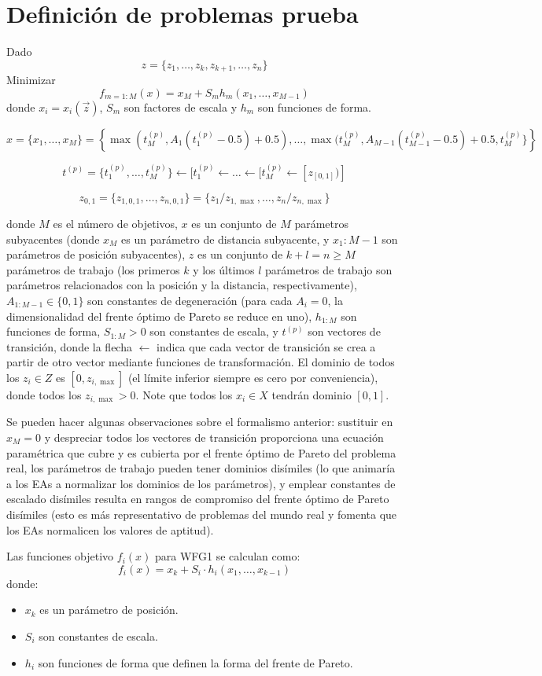 \chapter{Definición de problemas prueba}


Dado 
$$ z = \{z_1, \ldots, z_k, z_{k+1}, \ldots, z_n\} $$
Minimizar
$$ f_{m=1:M}(x) = x_M + S_m h_m(x_1, \ldots, x_{M-1}) $$
donde $x_i =x_i(\vec{z})$, $S_m$ son factores de escala y $h_m$ son funciones de forma.



$$    x = \{x_1, \ldots, x_M\} = \left\{ \max(t_M^{(p)}, A_1(t_1^{(p)} - 0.5) + 0.5), \ldots, \max(t_M^{(p)}, A_{M-1}(t_{M-1}^{(p)} - 0.5) + 0.5, t_M^{(p)}\} \right\} $$

$$ t^{(p)} = \{t_1^{(p)}, \ldots, t_M^{(p)}\} \leftarrow [t^{(p)}_1 \leftarrow \ldots \leftarrow [t^{(p)}_M \leftarrow [z_{[0,1]})] $$

$$ z_{0,1} = \{z_{1,0,1}, \ldots, z_{n,0,1}\} = \{z_1/z_{1,\max}, \ldots, z_n/z_{n,\max}\} $$


donde $M$ es el número de objetivos, $x$ es un conjunto de $M$ parámetros subyacentes (donde $x_M$ es un parámetro de distancia subyacente, y $x_1:M-1$ son parámetros de posición subyacentes), $z$ es un conjunto de $k + l = n \geq M$ parámetros de trabajo (los primeros $k$ y los últimos $l$ parámetros de trabajo son parámetros relacionados con la posición y la distancia, respectivamente), $A_{1:M-1} \in \{0, 1\}$ son constantes de degeneración (para cada $A_i = 0$, la dimensionalidad del frente óptimo de Pareto se reduce en uno), $h_{1:M}$ son funciones de forma, $S_{1:M} > 0$ son constantes de escala, y $t^{(p)}$ son vectores de transición, donde la flecha  $\leftarrow$ indica que cada vector de transición se crea a partir de otro vector mediante funciones de transformación. El dominio de todos los $z_i \in Z$ es $[0, z_{i,\max}]$ (el límite inferior siempre es cero por conveniencia), donde todos los $z_{i,\max} > 0$. Note que todos los $x_i \in X$ tendrán dominio $[0, 1]$.

Se pueden hacer algunas observaciones sobre el formalismo anterior: sustituir en $x_M = 0$ y despreciar todos los vectores de transición proporciona una ecuación paramétrica que cubre y es cubierta por el frente óptimo de Pareto del problema real, los parámetros de trabajo pueden tener dominios disímiles (lo que animaría a los EAs a normalizar los dominios de los parámetros), y emplear constantes de escalado disímiles resulta en rangos de compromiso del frente óptimo de Pareto disímiles (esto es más representativo de problemas del mundo real y fomenta que los EAs normalicen los valores de aptitud).

Las funciones objetivo $f_i(x)$ para WFG1 se calculan como:
$$f_i(x) = x_k + S_i \cdot h_i(x_1, \ldots, x_{k-1}) $$
donde:
\begin{itemize}
    \item $x_k$ es un parámetro de posición.
    \item $S_i$ son constantes de escala.
    \item $h_i$ son funciones de forma que definen la forma del frente de Pareto.
\end{itemize}

